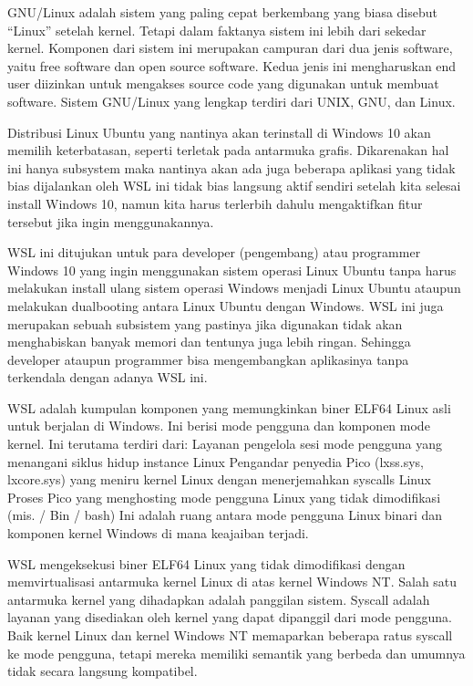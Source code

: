 \begin{enumeratae}
GNU/Linux adalah sistem yang paling cepat berkembang yang biasa disebut “Linux” setelah kernel. Tetapi dalam faktanya sistem ini lebih dari sekedar kernel. Komponen dari sistem ini merupakan campuran dari dua jenis software, yaitu free software dan open source software. Kedua jenis ini mengharuskan end user diizinkan untuk mengakses source code yang digunakan untuk membuat software. Sistem GNU/Linux yang lengkap terdiri dari UNIX, GNU, dan Linux.

Distribusi Linux Ubuntu yang nantinya akan terinstall di Windows 10 akan memilih keterbatasan, seperti terletak pada antarmuka grafis. Dikarenakan hal ini hanya subsystem maka nantinya akan ada juga beberapa aplikasi yang tidak bias dijalankan oleh WSL ini tidak bias langsung aktif sendiri setelah kita selesai install Windows 10, namun kita harus terlerbih dahulu mengaktifkan fitur tersebut jika ingin menggunakannya.

WSL ini ditujukan untuk para developer (pengembang) atau programmer Windows 10 yang ingin menggunakan sistem operasi Linux Ubuntu tanpa harus melakukan install ulang sistem operasi Windows menjadi Linux Ubuntu ataupun melakukan dualbooting antara Linux Ubuntu dengan Windows. WSL ini juga merupakan sebuah subsistem yang pastinya jika digunakan tidak akan menghabiskan banyak memori dan tentunya juga lebih ringan. Sehingga developer ataupun programmer bisa mengembangkan aplikasinya tanpa terkendala dengan adanya WSL ini.

WSL adalah kumpulan komponen yang memungkinkan biner ELF64 Linux asli untuk berjalan di Windows. Ini berisi mode pengguna dan komponen mode kernel. Ini terutama terdiri dari:
Layanan pengelola sesi mode pengguna yang menangani siklus hidup instance Linux
Pengandar penyedia Pico (lxss.sys, lxcore.sys) yang meniru kernel Linux dengan menerjemahkan syscalls Linux
Proses Pico yang menghosting mode pengguna Linux yang tidak dimodifikasi (mis. / Bin / bash)
Ini adalah ruang antara mode pengguna Linux binari dan komponen kernel Windows di mana keajaiban terjadi.

WSL mengeksekusi biner ELF64 Linux yang tidak dimodifikasi dengan memvirtualisasi antarmuka kernel Linux di atas kernel Windows NT. Salah satu antarmuka kernel yang dihadapkan adalah panggilan sistem. Syscall adalah layanan yang disediakan oleh kernel yang dapat dipanggil dari mode pengguna. Baik kernel Linux dan kernel Windows NT memaparkan beberapa ratus syscall ke mode pengguna, tetapi mereka memiliki semantik yang berbeda dan umumnya tidak secara langsung kompatibel.


\end{enumeratae}

